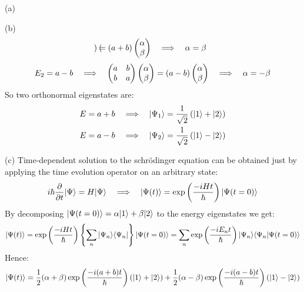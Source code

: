 \begin{homeworkProblem}
\begin{homeworkSectiom}{(a)}
\begin{homeworkSection}{(b)}
\begin{equation}
\begin{pmatrix}
\end{pmatrix}
=(a+b)
\begin{pmatrix}
\alpha\\
\beta
\end{pmatrix}
\quad\Longrightarrow\quad
\alpha=\beta
\end{equation}
\begin{equation}
E_2=a-b\quad\Longrightarrow\quad 
\begin{pmatrix}
a & b\\
b & a
\end{pmatrix}
\begin{pmatrix}
\alpha\\
\beta
\end{pmatrix}
=(a-b)
\begin{pmatrix}
\alpha\\
\beta
\end{pmatrix}
\quad\Longrightarrow\quad
\alpha=-\beta
\end{equation}
So two orthonormal eigenstates are:
\begin{align}
&E=a+b\quad\Longrightarrow\quad|\Psi_1\rangle=\frac{1}{\sqrt{2}}\left(|1\rangle+|2\rangle\right)\\
&E=a-b\quad\Longrightarrow\quad|\Psi_2\rangle=\frac{1}{\sqrt{2}}\left(|1\rangle-|2\rangle\right)
\end{align}

\end{homeworkSection}
\begin{homeworkSection}{(c)}
Time-dependent solution to the schr\"odinger equation can be obtained just by applying the time evolution operator on an arbitrary state:
\begin{equation} 
i\hbar\frac{\partial}{\partial t}|\Psi\rangle=H|\Psi\rangle\quad\Longrightarrow\quad |\Psi(t)\rangle=\exp\left(\frac{-iHt}{\hbar}\right)|\Psi(t=0)\rangle
\end{equation}
By decomposing $|\Psi(t=0)\rangle=\alpha|1\rangle+\beta|2\rangle$ to the energy eigenstates we get:
\begin{equation}
|\Psi(t)\rangle=\exp\left(\frac{-iHt}{\hbar}\right)\left\{\sum_{n}|\Psi_n\rangle\langle \Psi_n|\right\}|\Psi(t=0)\rangle=
\sum_{n}\exp\left(\frac{-iE_nt}{\hbar}\right)|\Psi_n\rangle\langle\Psi_n|\Psi(t=0)\rangle
\end{equation}
Hence:
\begin{equation}\label{P1-1}
|\Psi(t)\rangle=\frac{1}{2}(\alpha+\beta)\exp\left(\frac{-i(a+b)t}{\hbar}\right)\left(|1\rangle+|2\rangle\right)
+\frac{1}{2}(\alpha-\beta)\exp\left(\frac{-i(a-b)t}{\hbar}\right)\left(|1\rangle-|2\rangle\right)
\end{equation}


\end{homeworkSection}
\end{homeworkSectiom}
\end{homeworkProblem}
